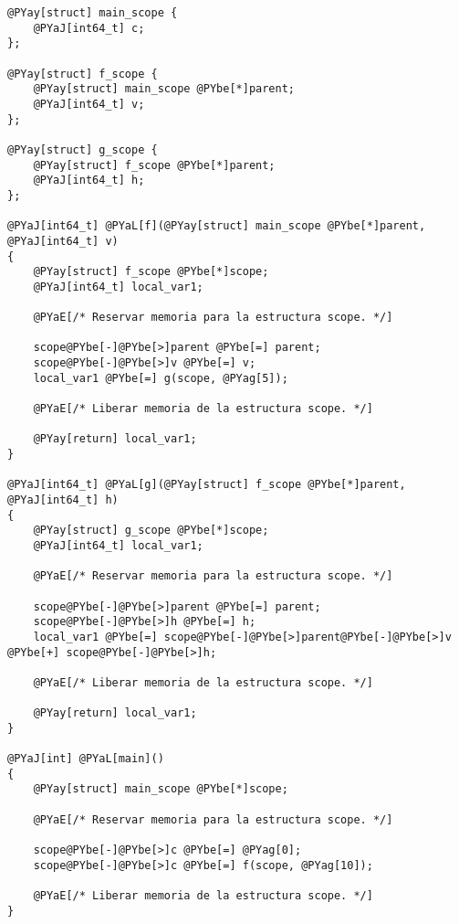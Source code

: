 \begin{Verbatim}[commandchars=@\[\]]
@PYay[struct] main_scope {
    @PYaJ[int64_t] c;
};

@PYay[struct] f_scope {
    @PYay[struct] main_scope @PYbe[*]parent;
    @PYaJ[int64_t] v;
};

@PYay[struct] g_scope {
    @PYay[struct] f_scope @PYbe[*]parent;
    @PYaJ[int64_t] h;
};

@PYaJ[int64_t] @PYaL[f](@PYay[struct] main_scope @PYbe[*]parent, @PYaJ[int64_t] v)
{
    @PYay[struct] f_scope @PYbe[*]scope;
    @PYaJ[int64_t] local_var1;

    @PYaE[/* Reservar memoria para la estructura scope. */]

    scope@PYbe[-]@PYbe[>]parent @PYbe[=] parent;
    scope@PYbe[-]@PYbe[>]v @PYbe[=] v;
    local_var1 @PYbe[=] g(scope, @PYag[5]);

    @PYaE[/* Liberar memoria de la estructura scope. */]

    @PYay[return] local_var1;
}

@PYaJ[int64_t] @PYaL[g](@PYay[struct] f_scope @PYbe[*]parent, @PYaJ[int64_t] h)
{
    @PYay[struct] g_scope @PYbe[*]scope;
    @PYaJ[int64_t] local_var1;

    @PYaE[/* Reservar memoria para la estructura scope. */]

    scope@PYbe[-]@PYbe[>]parent @PYbe[=] parent;
    scope@PYbe[-]@PYbe[>]h @PYbe[=] h;
    local_var1 @PYbe[=] scope@PYbe[-]@PYbe[>]parent@PYbe[-]@PYbe[>]v @PYbe[+] scope@PYbe[-]@PYbe[>]h;

    @PYaE[/* Liberar memoria de la estructura scope. */]

    @PYay[return] local_var1;
}

@PYaJ[int] @PYaL[main]()
{
    @PYay[struct] main_scope @PYbe[*]scope;

    @PYaE[/* Reservar memoria para la estructura scope. */]

    scope@PYbe[-]@PYbe[>]c @PYbe[=] @PYag[0];
    scope@PYbe[-]@PYbe[>]c @PYbe[=] f(scope, @PYag[10]);

    @PYaE[/* Liberar memoria de la estructura scope. */]
}
\end{Verbatim}
